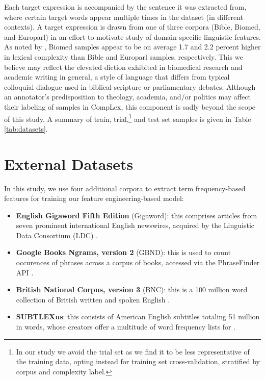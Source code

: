 \documentclass{dcthesis}
\theoremstyle{definition}
\theoremstyle{remark}
\begin{document}
Each target expression is accompanied by the sentence it was extracted from, where certain target words appear multiple times in the dataset (in different contexts). A target expression is drawn from one of three corpora (Bible, Biomed, and Europarl) in an effort to motivate study of domain-specific linguistic features. As noted by \citet{shardlow2020complex}, Biomed samples appear to be on average 1.7 and 2.2 percent higher in lexical complexity than Bible and Europarl samples, respectively. This we believe may reflect the elevated diction exhibited in biomedical research and academic writing in general, a style of language that differs from typical colloquial dialogue used in biblical scripture or parliamentary debates. Although an annotator's predisposition to theology, academia, and/or politics may affect their labeling of samples in CompLex, this component is sadly beyond the scope of this study. A summary of train, trial,\footnote{In our study we avoid the trial set as we find it to be less representative of the training data, opting instead for training set cross-validation, stratified by corpus and complexity label.} and test set samples is given in Table \ref{tab:datasets}.

\section{External Datasets}

In this study, we use four additional corpora to extract term frequency-based features for training our feature engineering-based model:

\begin{itemize}
  \item \textbf{English Gigaword Fifth Edition} (Gigaword): this comprises articles from seven prominent international English newswires, acquired by the Linguistic Data Consortium (LDC) \citep{gigaword}.
  \item \textbf{Google Books Ngrams, version 2} (GBND): this is used to count occurences of phrases across a corpus of books, accessed via the PhraseFinder API \citep{phrasefinder}.
  \item \textbf{British National Corpus, version 3} (BNC): this is a 100 million word collection of British written and spoken English \citep{BNC}.
  \item \textbf{SUBTLEXus}: this consists of American English subtitles totaling 51 million in words, whose creators offer a multitude of word frequency lists for \citep{Brysbaert2009MovingBK}.
\end{itemize}
\end{document}
